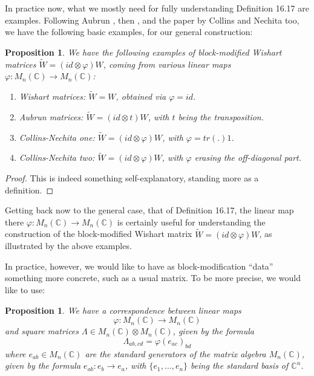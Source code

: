 \documentclass[12pt]{amsbook}
\newtheorem{proposition}[theorem]{Proposition}
\begin{document}
In practice now, what we mostly need for fully understanding Definition 16.17 are examples. Following Aubrun \cite{aub}, then \cite{bn1}, and the paper by Collins and Nechita \cite{cne} too, we have the following basic examples, for our general construction:

\begin{proposition}
We have the following examples of block-modified Wishart matrices $\widetilde{W}=(id\otimes\varphi)W$, coming from various linear maps $\varphi:M_n(\mathbb C)\to M_n(\mathbb C)$:
\begin{enumerate}
\item Wishart matrices: $\widetilde{W}=W$, obtained via $\varphi=id$.

\item Aubrun matrices: $\widetilde{W}=(id\otimes t)W$, with $t$ being the transposition.

\item Collins-Nechita one: $\widetilde{W}=(id\otimes\varphi)W$, with $\varphi=tr(.)1$.

\item Collins-Nechita two: $\widetilde{W}=(id\otimes\varphi)W$, with $\varphi$ erasing the off-diagonal part.
\end{enumerate}
\end{proposition}

\begin{proof}
This is indeed something self-explanatory, standing more as a definition.
\end{proof}

Getting back now to the general case, that of Definition 16.17, the linear map there $\varphi:M_n(\mathbb C)\to M_n(\mathbb C)$ is certainly useful for understanding the construction of the block-modified Wishart matrix $\widetilde{W}=(id\otimes\varphi)W$, as illustrated by the above examples. 

\bigskip

In practice, however, we would like to have as block-modification ``data'' something more concrete, such as a usual matrix. To be more precise, we would like to use:

\begin{proposition}
We have a correspondence between linear maps 
$$\varphi:M_n(\mathbb C)\to M_n(\mathbb C)$$
and square matrices $\Lambda\in M_n(\mathbb C)\otimes M_n(\mathbb C)$, given by the formula
$$\Lambda_{ab,cd}=\varphi(e_{ac})_{bd}$$
where $e_{ab}\in M_n(\mathbb C)$ are the standard generators of the matrix algebra $M_n(\mathbb C)$, given by the formula $e_{ab}:e_b\to e_a$, with $\{e_1,\ldots,e_n\}$ being the standard basis of $\mathbb C^n$.
\end{proposition}
\end{document}
